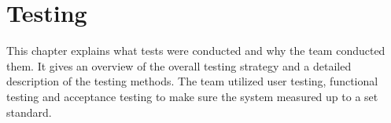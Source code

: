 \chapter{Testing}
This chapter explains what tests were conducted and why the team conducted them. It gives an overview of the overall testing strategy and a detailed description of the testing methods. The team utilized user testing, functional testing and acceptance testing to make sure the system measured up to a set standard.



